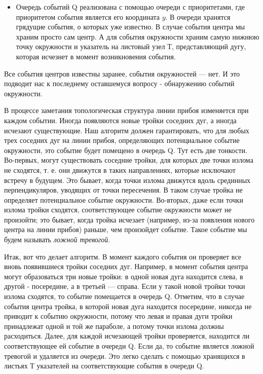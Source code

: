 \begin{itemize}
    \item Очередь  событий  Q  реализована  с  помощью  очереди  с  приоритетами,  где приоритетом  события  является  его  координата  $y$.
    В  очереди  хранятся  грядущие  события,  о  которых  уже  известно.
    В  случае  события  центра  мы  храним  просто  сам  центр.  
    А  для  события  окружности  храним  самую  нижнюю точку  окружности  и  указатель  на  листовый  узел  Т,  представляющий  дугу, которая  исчезнет  в  момент  возникновения  события.
\end{itemize}

Все  события  центров  известны  заранее,  события  окружностей --- нет.
И  это  подводит  нас  к  последнему  оставшемуся  вопросу  -  обнаружению  событий  окружности.

В  процессе  заметания  топологическая  структура  линии  прибоя  изменяется при  каждом  событии.
Иногда  появляются  новые  тройки  соседних  дуг,  а  иногда исчезают  существующие.
Наш  алгоритм  должен  гарантировать,  что  для  любых  трех  соседних  дуг  на  линии прибоя,  определяющих  потенциальное  событие  окружности,  это  событие  будет  помещено  в  очередь  Q.
Тут  есть две  тонкости.
Во-первых,  могут  существовать  соседние тройки,  для  которых  две  точки  излома  не  сходятся,  т.  е. они  движутся  в  таких  направлениях,  которые  исключают  встречу  в  будущем.  
Это  бывает,  когда  точки  излома движутся  вдоль  срединных  перпендикуляров,  уводящих  от  точки  пересечения.
В  таком  случае  тройка  не  определяет  потенциальное событие  окружности.
Во-вторых,  даже  если  точки  излома  тройки  сходятся, соответствующее  событие  окружности  может  не  произойти;  это  бывает,  когда  тройка исчезает  (например,  из-за  появления  нового  центра  на  линии  прибоя)  раньше,  чем 
произойдет  событие.
Такое  событие  мы  будем  называть  \textit{ложной  тревогой}.

Итак,  вот  что  делает  алгоритм.
В  момент  каждого  события  он  проверяет  все вновь  появившиеся  тройки  соседних  дуг.
Например,  в  момент  события  центра могут  образоваться  три  новые  тройки:  в  одной  новая  дуга  находится  слева,  в  другой  -  посередине,  а  в  третьей  ---  справа.
Если  у  такой  новой  тройки  точки  излома сходятся,  то  событие  помещается  в  очередь  Q.
Отметим,  что  в  случае  события  центра  тройка,  в  которой  новая  дуга  находится  посередине,  никогда  не  приводит  к событию  окружности,  потому  что  левая  и  правая  дуги  тройки  принадлежат  одной и  той  же  параболе,  а  потому  точки  излома  должны  расходиться.
Далее,  для  каждой  исчезающей  тройки  проверяется,  находится ли  соответствующее  ей  событие  в очереди  Q.
Если  да,  то  событие  является  ложной  тревогой  и  удаляется  из  очереди.
Это  легко  сделать  с  помощью  хранящихся  в  листьях  Т  указателей  на  соответствующие  события  в  очереди  Q.

